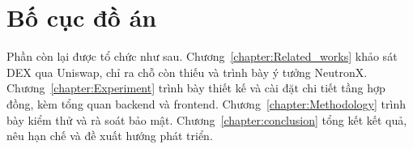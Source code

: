 \documentclass[../DoAn.tex]{subfiles}
\begin{document}
\section{Bố cục đồ án}
\label{section:1.4}

Phần còn lại được tổ chức như sau. Chương~\ref{chapter:Related_works} khảo sát DEX qua Uniswap, chỉ ra chỗ còn thiếu và trình bày ý tưởng NeutronX. Chương~\ref{chapter:Experiment} trình bày thiết kế và cài đặt chi tiết tầng hợp đồng, kèm tổng quan backend và frontend. Chương~\ref{chapter:Methodology} trình bày kiểm thử và rà soát bảo mật. Chương~\ref{chapter:conclusion} tổng kết kết quả, nêu hạn chế và đề xuất hướng phát triển.
\end{document}
